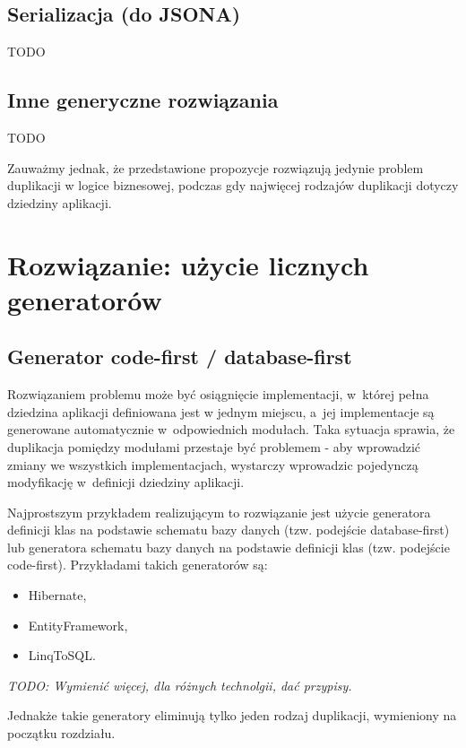 \subsection{Serializacja (do JSONA)}
TODO


\subsection{Inne generyczne rozwiązania}
TODO

Zauważmy jednak, że przedstawione propozycje rozwiązują jedynie problem duplikacji w logice biznesowej, podczas gdy najwięcej rodzajów duplikacji dotyczy dziedziny aplikacji.



\section{Rozwiązanie: użycie licznych generatorów}

\subsection{Generator code-first / database-first}

Rozwiązaniem problemu może być osiągnięcie implementacji, w~której pełna dziedzina aplikacji definiowana jest w jednym miejscu, a~jej implementacje są generowane automatycznie w~odpowiednich modułach.
Taka sytuacja sprawia, że duplikacja pomiędzy modułami przestaje być problemem - aby wprowadzić zmiany we wszystkich implementacjach, wystarczy wprowadzic pojedynczą modyfikację w~definicji dziedziny aplikacji.

Najprostszym przykładem realizującym to rozwiązanie jest użycie generatora definicji klas na podstawie schematu bazy danych (tzw. podejście database-first) lub generatora schematu bazy danych na podstawie definicji klas (tzw. podejście code-first).
Przykładami takich generatorów są:

\begin{itemize}
 \item Hibernate,
 \item EntityFramework,
 \item LinqToSQL.
\end{itemize}

\emph{TODO: Wymienić więcej, dla różnych technolgii, dać przypisy.}

Jednakże takie generatory eliminują tylko jeden rodzaj duplikacji, wymieniony na początku rozdziału.


